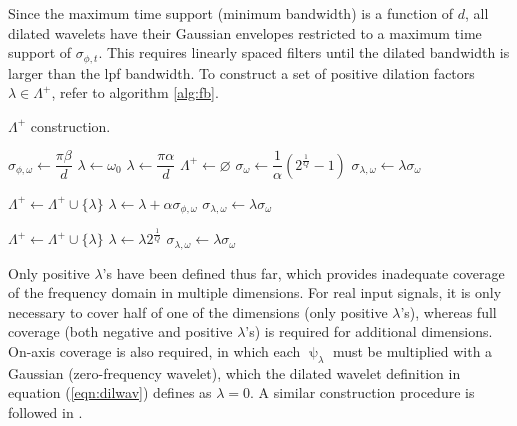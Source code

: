  Since the maximum time support (minimum bandwidth) is a function of $d$, all dilated wavelets have their Gaussian envelopes restricted to a maximum time support of $\sigma_{\phi, t}$. This requires linearly spaced filters until the dilated bandwidth is larger than the \ac{lpf} bandwidth. To construct a set of positive dilation factors $\lambda \in \Lambda^+$, refer to algorithm \ref{alg:fb}.

\begin{algorithm}    
\caption{$\Lambda^+$ construction.}\label{alg:fb}
\begin{algorithmic}
    \State $\sigma_{\phi, \omega} \gets \dfrac{\pi\beta}{d}$
        \State $\lambda \gets \omega_0$
    \Else{}
        \State $\lambda \gets \dfrac{\pi\alpha}{d}$
    \EndIf
    \State $\Lambda^+ \gets \varnothing$
    \State $\sigma_\omega \gets \dfrac{1}{\alpha}\left( 2^\frac{1}{Q} - 1 \right)$
    \State $\sigma_{\lambda, \omega} \gets \lambda\sigma_\omega$
    
        \State $\Lambda^+ \gets \Lambda^+ \cup \{\lambda\}$
        \State $\lambda \gets \lambda + \alpha \sigma_{\phi, \omega}$ 
        \State $\sigma_{\lambda, \omega} \gets \lambda\sigma_\omega$
    \EndWhile
    
    \While{$\lambda < \pi$}
        \State $\Lambda^+ \gets \Lambda^+ \cup \{\lambda\}$
        \State $\lambda \gets \lambda 2^{\frac{1}{Q}}$
        \State $\sigma_{\lambda, \omega} \gets \lambda\sigma_\omega$
    \EndWhile
\end{algorithmic}
\end{algorithm}

Only positive $\lambda$'s have been defined thus far, which provides inadequate coverage of the frequency domain in multiple dimensions. For real input signals, it is only necessary to cover half of one of the dimensions (only positive $\lambda$'s), whereas full coverage (both negative and positive $\lambda$'s) is required for additional dimensions. On-axis coverage is also required, in which each $\uppsi_\lambda$ must be multiplied with a Gaussian (zero-frequency wavelet), which the dilated wavelet definition in equation (\ref{eqn:dilwav}) defines as $\lambda=0$. A similar construction procedure is followed in \cite{jointtfscattering2}.


